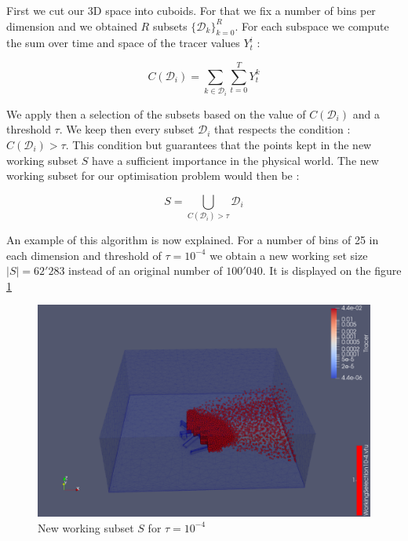 First we cut our 3D space into cuboids. For that we fix a number of bins per dimension and we obtained $R$ subsets $\{\mathcal{D}_k\}_{k=0}^R $. For each subspace we compute the sum over time and space of the tracer values $Y_t^i$  : 

\begin{equation}
	C(\mathcal{D}_i) = \sum_{k \in \mathcal{D}_i} \sum_{t = 0}^T Y_t^k
\end{equation}

We apply then a selection of the subsets based on the value of $C(\mathcal{D}_i)$ and a  threshold $\tau$. We keep then every subset $\mathcal{D}_i$ that respects the condition : $C(\mathcal{D}_i) > \tau$. This condition but guarantees that the points kept in the new working subset $S$ have a sufficient importance in the physical world. The new working subset for our optimisation problem would then be : 

\begin{equation}
	S = \bigcup_{C(\mathcal{D}_i) > \tau} \mathcal{D}_i
\end{equation} 

An example of this algorithm is now explained. For a number of bins of 25 in each dimension and threshold of $\tau = 10^{-4}$ we obtain a new working set size $|S| = 62'283$ instead of an original number of $100'040$. It is displayed on the figure \ref{fig:working_subset}

\begin{figure}[t]
\centering
	\includegraphics[width = 0.8 \textwidth]{figures/Tracer/working_subset_10^-4}
	\caption{New working subset $S$ for $\tau = 10^{-4}$}
	\label{fig:working_subset}
\end{figure}
